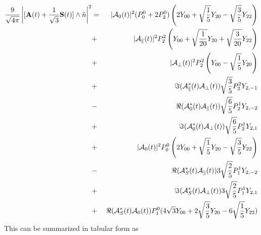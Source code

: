 \documentclass[a4paper,9pt,twosided]{article}
\begin{document}
\begin{eqnarray}
\frac{9 }{\sqrt{4\pi}} \left|[{ \bf A}(t) + \frac{1}{\sqrt{3}}{\bf S}(t)] \wedge \hat{n}\right|^2
                              &=&|{\cal A}_0(t)|^2  (P_0^0+2P_2^0 ) \left( 2 Y_{00}+\sqrt{\frac{1}{5}}Y_{20}-\sqrt{\frac{3}{5}}Y_{22} \right) \\
                              &+&|{\cal A}_\parallel(t)|^2 P_2^2 \left( Y_{00}+\sqrt{\frac{1}{20}}Y_{20}+\sqrt{\frac{3}{20}}Y_{22}  \right)  \\
                              &+&|{\cal A}_\perp(t)|^2  P_2^2 \left( Y_{00} - \sqrt{\frac{1}{5}}Y_{20}\right)\\
                              &+&\Im({\cal A}_\parallel^*(t){\cal A}_\perp(t)) \sqrt{\frac{3}{5}}P_2^2 Y_{2,-1}  \\
                              &-&\Re({\cal A}_0^*(t){\cal A}_\parallel(t)  )   \sqrt{\frac{6}{5}}P_2^1 Y_{2,-2} \\
                              &+&\Im({\cal A}_0^*(t) {\cal A}_\perp(t) )       \sqrt{\frac{6}{5}}P_2^1Y_{2,1} \\
                              &+&|{\cal A}_0(t)|^2 P_0^0\left( 2 Y_{00}+\sqrt{\frac{1}{5}}Y_{20}-\sqrt{\frac{3}{5}}Y_{22} \right)\\
                              &-&\Re({\cal A}_S^*(t){\cal A}_\parallel(t))3\sqrt{\frac{2}{5}}P_1^1Y_{2,-2}\\
                              &+&\Im({\cal A}_S^*(t){\cal A}_\perp(t))3\sqrt{\frac{2}{5}}P_1^1Y_{2,1}\\
                              &+&\Re({\cal A}_S^*(t){\cal A}_0(t)) P_1^0(4\sqrt{3}Y_{00}+2\sqrt{\frac{3}{5}}Y_{20}-6\sqrt{\frac{1}{5}}Y_{22})
\end{eqnarray}
This can be summarized in tabular form as
\end{document}
